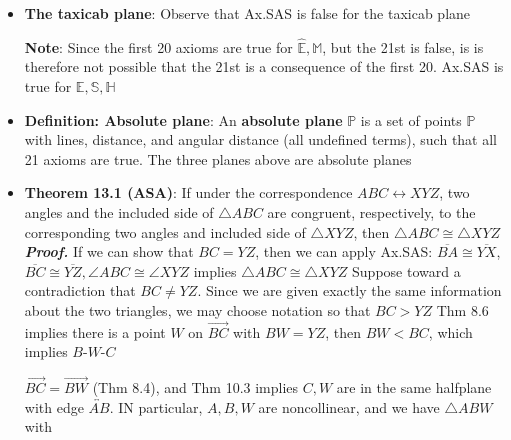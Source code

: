 \documentclass{report}
\begin{document}
\begin{itemize}
            \bigbreak \noindent 
            \begin{figure}[ht]
                \centering
                \label{fig:bp}
            \end{figure}
        \item \textbf{The taxicab plane}: Observe that Ax.SAS is false for the taxicab plane
            \bigbreak \noindent 
            \begin{figure}[ht]
                \centering
                \label{fig:taxi}
            \end{figure}
            \bigbreak \noindent 
            \textbf{Note}: Since the first 20 axioms are true for $\hat{\mathbb{E}}, \mathbb{M} $, but the 21st is false, is is therefore not possible that the 21st is a consequence of the first 20.
            \bigbreak \noindent 
            Ax.SAS is true for $\mathbb{E}, \mathbb{S}, \mathbb{H}$
        \item \textbf{Definition: Absolute plane}: An \textbf{absolute plane} $\mathbb{P}$ is a set of points $\mathbb{P}$ with lines, distance, and angular distance (all undefined terms), such that all 21 axioms are true. The three planes above are absolute planes
        \item \textbf{Theorem 13.1 (ASA)}: If under the correspondence $ABC \leftrightarrow XYZ$, two angles and the included side of $\triangle ABC$ are congruent, respectively, to the corresponding two angles and included side of $\triangle XYZ$, then $\triangle ABC \cong \triangle XYZ $
            \bigbreak \noindent 
            \textbf{\textit{Proof.}} If we can show that $BC = YZ$, then we can apply Ax.SAS: $ \overline{BA} \cong \overline{YX}$, $\overline{BC} \cong \overline{YZ}, \angle ABC \cong \angle XYZ$ implies $\triangle ABC \cong \triangle XYZ$
            \bigbreak \noindent 
            Suppose toward a contradiction that $ BC \ne YZ$. Since we are given exactly the same information about the two triangles, we may choose notation so that $BC > YZ$
            \bigbreak \noindent 
            Thm 8.6 implies there is a point $W$ on $\overrightarrow{BC}$ with $BW = YZ$, then $BW < BC$, which implies $ B\text{-}W\text{-}C$
            \bigbreak \noindent 
            \begin{figure}[ht]
                \centering
                \label{fig:thefig}
            \end{figure}
            \bigbreak \noindent 
            $\overrightarrow{BC} = \overrightarrow{BW}$ (Thm 8.4), and Thm 10.3 implies $C,W$ are in the same halfplane with edge $\overleftrightarrow{AB}$. IN particular, $A,B,W$ are noncollinear, and we have $\triangle ABW$ with

\end{itemize}
\end{document}
